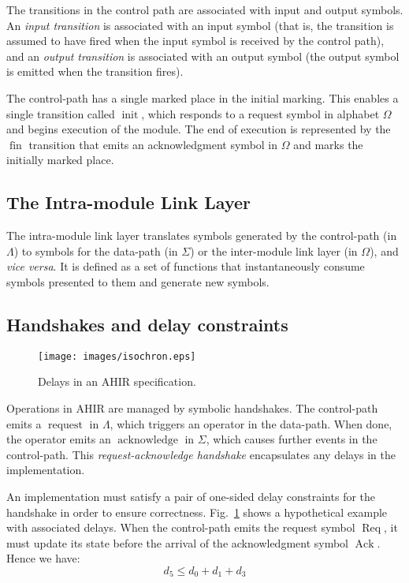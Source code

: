 \documentclass[conference]{IEEEtran}
\newcommand{\sym}[1]{$\operatorname{#1}$}
\begin{document}
The transitions in the control path are associated with input and
output symbols.  An {\em input transition} is associated with
an input symbol (that is, the transition is assumed to have fired
when the input symbol is received by the control path), and an {\em output transition}
is associated with an output symbol (the output symbol is emitted
when the transition fires).

The control-path has a single marked place in the initial marking.
This enables a single transition called \sym{init}, which responds to
a request symbol in alphabet $\Omega$ and begins execution of the
module. The end of execution is represented by the \sym{fin}
transition that emits an acknowledgment symbol in $\Omega$ and marks
the initially marked place.

\subsection{The Intra-module Link Layer}

The intra-module link layer translates symbols generated by the
control-path (in $\Lambda$) to symbols for the data-path (in $\Sigma$)
or the inter-module link layer (in $\Omega$), and \emph{vice versa}.
It is defined as a set of functions that instantaneously consume
symbols presented to them and generate new symbols.

\subsection{Handshakes and delay constraints}
\label{sect:handshakes}

\begin{figure}[!t]
\centering
\texttt{[image: images/isochron.eps]}
\caption{Delays in an AHIR specification.}
\label{fig:isochron}
\end{figure}

Operations in AHIR are managed by symbolic handshakes. The
control-path emits a \sym{request} in $\Lambda$, which triggers an
operator in the data-path. When done, the operator emits an
\sym{acknowledge} in $\Sigma$, which causes further events in the
control-path. This \emph{request-acknowledge handshake} encapsulates
any delays in the implementation.

An implementation must satisfy a pair of one-sided delay constraints
for the handshake in order to ensure correctness.
Fig.~\ref{fig:isochron} shows a hypothetical example with associated
delays. When the control-path emits the request symbol \sym{Req}, it
must update its state before the arrival of the acknowledgment symbol
\sym{Ack}. Hence we have:
\[d_5 \le d_0 + d_1 + d_3\]
\end{document}
